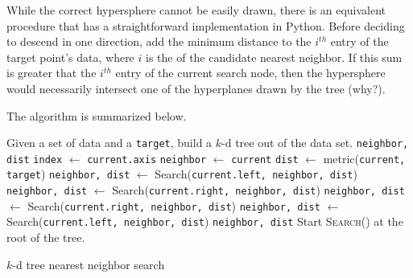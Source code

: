 While the correct hypersphere cannot be easily drawn, there is an equivalent procedure that has a straightforward implementation in Python.
Before deciding to descend in one direction, add the minimum distance to the $i^{th}$ entry of the target point's data, where $i$ is the  of the candidate nearest neighbor.
If this sum is greater that the $i^{th}$ entry of the current search node, then the hypersphere would necessarily intersect one of the hyperplanes drawn by the tree (why?).

The algorithm is summarized below.

\clearpage

\begin{algorithm}[h] %
\begin{algorithmic}[1]
\State Given a set of data and a \texttt{target}, build a $k$-d tree out of the data set.
    \State {} \texttt{neighbor, dist}
\EndIf
\State \texttt{index} $\gets$ \texttt{current.axis}
    \State \texttt{neighbor} $\gets$ \texttt{current}
    \State \texttt{dist} $\gets$ metric(\texttt{current, target})
\EndIf
{}
    \State \texttt{neighbor, dist} $\gets$ Search(\texttt{current.left, neighbor, dist})
        \State \texttt{neighbor, dist} $\gets$ Search(\texttt{current.right, neighbor, dist})
    \EndIf
\Else
    \State \texttt{neighbor, dist} $\gets$ Search(\texttt{current.right, neighbor, dist})
        \State \texttt{neighbor, dist} $\gets$ Search(\texttt{current.left, neighbor, dist})
    \EndIf
\EndIf
\State {} \texttt{neighbor, dist}
\EndProcedure
\State Start \textsc{Search()} at the root of the tree.
\end{algorithmic}
\caption{$k$-d tree nearest neighbor search}
\label{alg:kdneighborz}
\end{algorithm}

